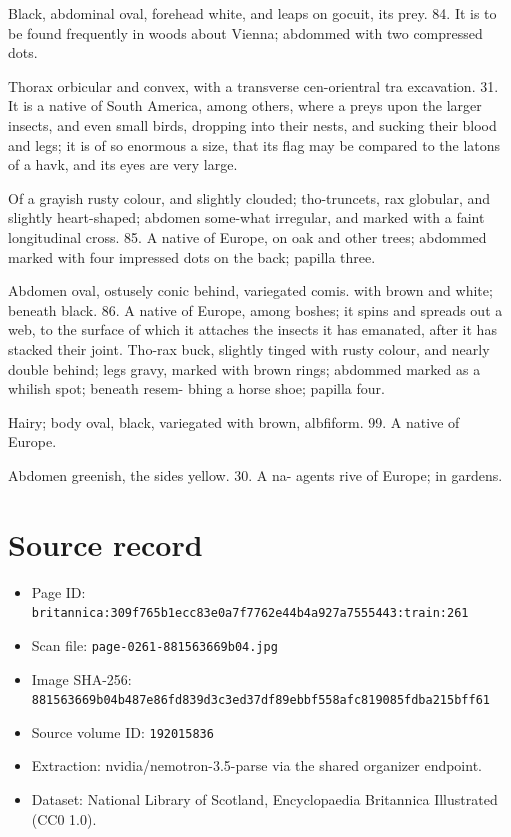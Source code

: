 \documentclass{article}
\begin{document}
Black, abdominal oval, forehead white, and leaps on gocuit, its prey. 84. It is to be found frequently in woods about Vienna; abdommed with two compressed dots.

Thorax orbicular and convex, with a transverse cen-orientral tra excavation. 31. It is a native of South America, among others, where a preys upon the larger insects, and even small birds, dropping into their nests, and sucking their blood and legs; it is of so enormous a size, that its flag may be compared to the latons of a havk, and its eyes are very large.

Of a grayish rusty colour, and slightly clouded; tho-truncets, rax globular, and slightly heart-shaped; abdomen some-what irregular, and marked with a faint longitudinal cross. 85. A native of Europe, on oak and other trees; abdommed marked with four impressed dots on the back; papilla three.

Abdomen oval, ostusely conic behind, variegated comis. with brown and white; beneath black. 86. A native of Europe, among boshes; it spins and spreads out a web, to the surface of which it attaches the insects it has emanated, after it has stacked their joint. Tho-rax buck, slightly tinged with rusty colour, and nearly double behind; legs gravy, marked with brown rings; abdommed marked as a whilish spot; beneath resem- bhing a horse shoe; papilla four.

Hairy; body oval, black, variegated with brown, albfiform. 99. A native of Europe.

Abdomen greenish, the sides yellow. 30. A na- agents rive of Europe; in gardens.

\section*{Source record}
\begin{itemize}
\item Page ID: \texttt{britannica:309f765b1ecc83e0a7f7762e44b4a927a7555443:train:261}
\item Scan file: \texttt{page-0261-881563669b04.jpg}
\item Image SHA-256: \texttt{881563669b04b487e86fd839d3c3ed37df89ebbf558afc819085fdba215bff61}
\item Source volume ID: \texttt{192015836}
\item Extraction: nvidia/nemotron-3.5-parse via the shared organizer endpoint.
\item Dataset: National Library of Scotland, Encyclopaedia Britannica Illustrated (CC0 1.0).
\end{itemize}
\end{document}
